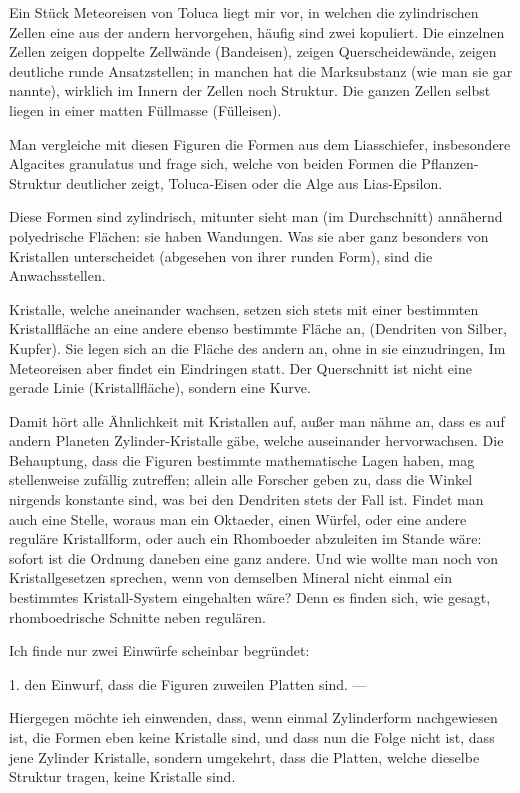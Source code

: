 \documentclass[a4paper, 12pt, oneside]{article}
\begin{document}
Ein Stück Meteoreisen von Toluca liegt mir vor, in welchen die zylindrischen Zellen eine aus der andern hervorgehen, häufig sind zwei kopuliert. Die einzelnen Zellen zeigen doppelte Zellwände (Bandeisen), zeigen Querscheidewände, zeigen deutliche runde Ansatzstellen; in manchen hat die Marksubstanz (wie man sie gar nannte), wirklich im Innern der Zellen noch Struktur. Die ganzen Zellen selbst liegen in einer matten Füllmasse (Fülleisen).

Man vergleiche mit diesen Figuren die Formen aus dem Liasschiefer, insbesondere Algacites granulatus und frage sich, welche von beiden Formen die Pflanzen-Struktur deutlicher zeigt, Toluca-Eisen oder die Alge aus Lias-Epsilon.

Diese Formen sind zylindrisch, mitunter sieht man (im Durchschnitt) annähernd polyedrische Flächen: sie haben Wandungen. Was sie aber ganz besonders von Kristallen unterscheidet (abgesehen von ihrer runden Form), sind die Anwachsstellen.

Kristalle, welche aneinander wachsen, setzen sich stets mit einer bestimmten Kristallfläche an eine andere ebenso bestimmte Fläche an, (Dendriten von Silber, Kupfer). Sie legen sich an die Fläche des andern an, ohne in sie einzudringen, Im Meteoreisen aber findet ein Eindringen statt. Der Querschnitt ist nicht eine gerade Linie (Kristallfläche), sondern eine Kurve.

Damit hört alle Ähnlichkeit mit Kristallen auf, außer man nähme an, dass es auf andern Planeten Zylinder-Kristalle gäbe, welche auseinander hervorwachsen. Die Behauptung, dass die Figuren bestimmte mathematische Lagen haben, mag stellenweise zufällig zutreffen; allein alle Forscher geben zu, dass die Winkel nirgends konstante sind, was bei den Dendriten stets der Fall ist. Findet man auch eine Stelle, woraus man ein Oktaeder, einen Würfel, oder eine andere reguläre Kristallform, oder auch ein Rhomboeder abzuleiten im Stande wäre: sofort ist die Ordnung daneben eine ganz andere. Und wie wollte man noch von Kristallgesetzen sprechen, wenn von demselben Mineral nicht einmal ein bestimmtes Kristall-System eingehalten wäre? Denn es finden sich, wie gesagt, rhomboedrische Schnitte neben regulären.

Ich finde nur zwei Einwürfe scheinbar begründet:

1. den Einwurf, dass die Figuren zuweilen Platten sind. —

Hiergegen möchte ieh einwenden, dass, wenn einmal Zylinderform nachgewiesen ist, die Formen eben keine Kristalle sind, und dass nun die Folge nicht ist, dass jene Zylinder Kristalle, sondern umgekehrt, dass die Platten, welche dieselbe Struktur tragen, keine Kristalle sind.
\end{document}
